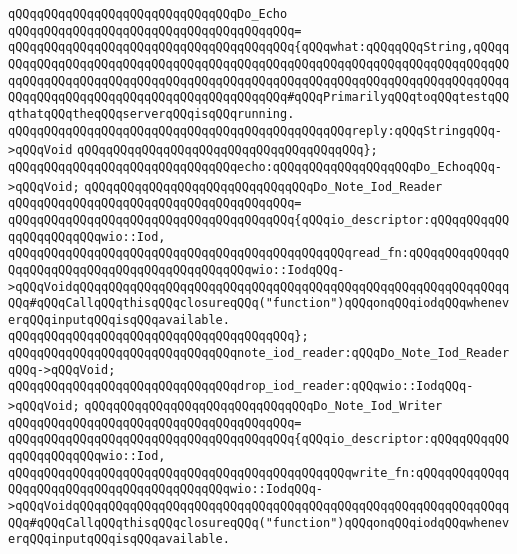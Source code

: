 \newline
\verb|qQQqqQQqqQQqqQQqqQQqqQQqqQQqqQQqDo_Echo|\newline
\verb|qQQqqQQqqQQqqQQqqQQqqQQqqQQqqQQqqQQqqQQq=|\newline
\verb|qQQqqQQqqQQqqQQqqQQqqQQqqQQqqQQqqQQqqQQq{qQQqwhat:qQQqqQQqString,qQQqqQQqqQQqqQQqqQQqqQQqqQQqqQQqqQQqqQQqqQQqqQQqqQQqqQQqqQQqqQQqqQQqqQQqqQQqqQQqqQQqqQQqqQQqqQQqqQQqqQQqqQQqqQQqqQQqqQQqqQQqqQQqqQQqqQQqqQQqqQQqqQQqqQQqqQQqqQQqqQQqqQQqqQQqqQQqqQQqqQQq#qQQqPrimarilyqQQqtoqQQqtestqQQqthatqQQqtheqQQqserverqQQqisqQQqrunning.|\newline
\verb|qQQqqQQqqQQqqQQqqQQqqQQqqQQqqQQqqQQqqQQqqQQqqQQqreply:qQQqStringqQQq->qQQqVoid|\newline
\verb|qQQqqQQqqQQqqQQqqQQqqQQqqQQqqQQqqQQqqQQq};|\newline
\verb|qQQqqQQqqQQqqQQqqQQqqQQqqQQqqQQqecho:qQQqqQQqqQQqqQQqqQQqDo_EchoqQQq->qQQqVoid;|\newline
\newline
\newline
\verb|qQQqqQQqqQQqqQQqqQQqqQQqqQQqqQQqDo_Note_Iod_Reader|\newline
\verb|qQQqqQQqqQQqqQQqqQQqqQQqqQQqqQQqqQQqqQQq=|\newline
\verb|qQQqqQQqqQQqqQQqqQQqqQQqqQQqqQQqqQQqqQQq{qQQqio_descriptor:qQQqqQQqqQQqqQQqqQQqqQQqwio::Iod,|\newline
\verb|qQQqqQQqqQQqqQQqqQQqqQQqqQQqqQQqqQQqqQQqqQQqqQQqread_fn:qQQqqQQqqQQqqQQqqQQqqQQqqQQqqQQqqQQqqQQqqQQqqQQqwio::IodqQQq->qQQqVoidqQQqqQQqqQQqqQQqqQQqqQQqqQQqqQQqqQQqqQQqqQQqqQQqqQQqqQQqqQQqqQQq#qQQqCallqQQqthisqQQqclosureqQQq("function")qQQqonqQQqiodqQQqwheneverqQQqinputqQQqisqQQqavailable.|\newline
\verb|qQQqqQQqqQQqqQQqqQQqqQQqqQQqqQQqqQQqqQQq};|\newline
\verb|qQQqqQQqqQQqqQQqqQQqqQQqqQQqqQQqnote_iod_reader:qQQqDo_Note_Iod_ReaderqQQq->qQQqVoid;|\newline
\verb|qQQqqQQqqQQqqQQqqQQqqQQqqQQqqQQqdrop_iod_reader:qQQqwio::IodqQQq->qQQqVoid;|\newline
\newline
\newline
\verb|qQQqqQQqqQQqqQQqqQQqqQQqqQQqqQQqDo_Note_Iod_Writer|\newline
\verb|qQQqqQQqqQQqqQQqqQQqqQQqqQQqqQQqqQQqqQQq=|\newline
\verb|qQQqqQQqqQQqqQQqqQQqqQQqqQQqqQQqqQQqqQQq{qQQqio_descriptor:qQQqqQQqqQQqqQQqqQQqqQQqwio::Iod,|\newline
\verb|qQQqqQQqqQQqqQQqqQQqqQQqqQQqqQQqqQQqqQQqqQQqqQQqwrite_fn:qQQqqQQqqQQqqQQqqQQqqQQqqQQqqQQqqQQqqQQqqQQqwio::IodqQQq->qQQqVoidqQQqqQQqqQQqqQQqqQQqqQQqqQQqqQQqqQQqqQQqqQQqqQQqqQQqqQQqqQQqqQQq#qQQqCallqQQqthisqQQqclosureqQQq("function")qQQqonqQQqiodqQQqwheneverqQQqinputqQQqisqQQqavailable.|\newline
